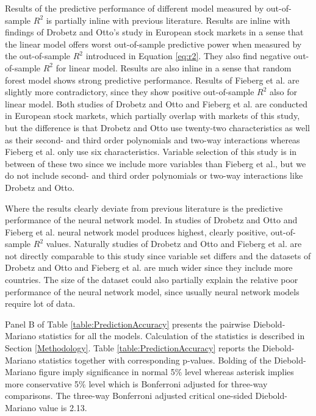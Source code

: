 \documentclass{article}
\begin{document}
Results of the predictive performance of different model measured by out-of-sample $R^2$ is partially inline with previous literature. Results are inline with findings of Drobetz and Otto's \citeyear{Drobetz} study in European stock markets in a sense that the linear model offers worst out-of-sample predictive power when measured by the out-of-sample $R^2$ introduced in Equation \ref{eq:r2}. They also find negative out-of-sample $R^2$ for linear model. Results are also inline in a sense that random forest model shows strong predictive performance. Results of Fieberg et al. \citeyear{Fieberg} are slightly more contradictory, since they show positive out-of-sample $R^2$ also for linear model\footnotemark. Both studies of Drobetz and Otto and Fieberg et al. are conducted in European stock markets, which partially overlap with markets of this study, but the difference is that Drobetz and Otto use twenty-two characteristics as well as their  second- and third order polynomials and two-way interactions whereas Fieberg et al. only use six characteristics. Variable selection of this study is in between of these two since we include more variables than Fieberg et al., but we do not include second- and third order polynomials or two-way interactions like Drobetz and Otto. \par


Where the results clearly deviate from previous literature is the predictive performance of the neural network model. In studies of Drobetz and Otto \citeyear{Drobetz} and Fieberg et al. \citeyear{Fieberg} neural network model produces highest, clearly positive, out-of-sample $R^2$ values. Naturally studies of Drobetz and Otto and Fieberg et al. are not directly comparable to this study since variable set differs and the datasets of  Drobetz and Otto and Fieberg et al. are much wider since they include more countries. The size of the dataset could also partially explain the relative poor performance of the neural network model, since usually neural network models require lot of data. \par

Panel B of Table \ref{table:PredictionAccuracy} presents the pairwise Diebold-Mariano statistics for all the models. Calculation of the statistics is described in Section \ref{Methodology}. Table \ref{table:PredictionAccuracy} reports the Diebold-Mariano statistics together with corresponding p-values. Bolding of the Diebold-Mariano figure imply significance in normal 5\% level whereas asterisk implies more conservative 5\% level which is Bonferroni adjusted for three-way comparisons. The three-way Bonferroni adjusted critical one-sided Diebold-Mariano value is 2.13. \par
\end{document}
